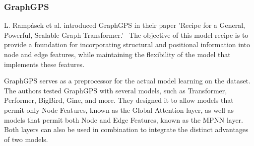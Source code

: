         
        
        
        
        
    

\subsubsection{GraphGPS}
L. Rampásek et al. introduced GraphGPS in their paper 'Recipe for a General, Powerful, Scalable Graph Transformer.'~\cite{2023graphgps} The objective of this model recipe is to provide a foundation for incorporating structural and positional information into node and edge features, while maintaining the flexibility of the model that implements these features.

GraphGPS serves as a preprocessor for the actual model learning on the dataset. The authors tested GraphGPS with several models, such as Transformer, Performer, BigBird, Gine, and more. They designed it to allow models that permit only Node Features, known as the Global Attention layer, as well as models that permit both Node and Edge Features, known as the MPNN layer. Both layers can also be used in combination to integrate the distinct advantages of two models.

